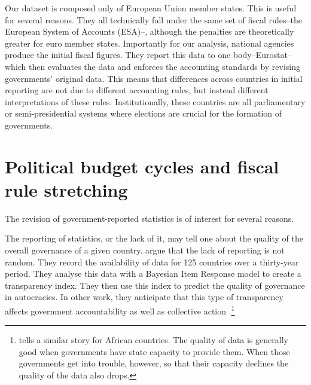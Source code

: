 \documentclass[]{article}
\begin{document}
Our dataset is composed only of European Union member states. This is useful for several reasons. They all technically fall under the same set of fiscal rules--the European System of Accounts (ESA)--, although the penalties are theoretically greater for euro member states.  Importantly for our analysis, national agencies produce the initial fiscal figures. They report this data to one body--Eurostat--which then evaluates the data and enforces the accounting standards by revising governments' original data. This means that differences across countries in initial reporting are not due to different accounting rules, but instead  different interpretations of these rules. Institutionally, these countries are all parliamentary or semi-presidential systems where elections are crucial for the formation of governments.


\section{Political budget cycles and fiscal rule stretching}

The revision of government-reported statistics is of interest for several reasons.

The reporting of statistics, or the lack of it, may tell one about the quality of the overall governance of a given country. \cite{Hollyer2014} argue that the lack of reporting is not random. They record the availability of data for 125 countries over a thirty-year period. They analyse this data with a Bayesian Item Response model to create a transparency index. They then use this index to predict the quality of governance in autocracies. In other work, they anticipate that this type of transparency affects government accountability as well as collective action \citep{hollyerforthcoming}.\footnote{\cite{jervin2013} tells a similar story for African countries. The quality of data is generally good when governments have state capacity to provide them. When those governments get into trouble, however, so that their capacity declines the quality of the data also drops.}
\end{document}
